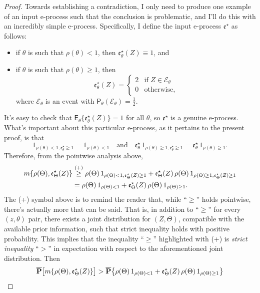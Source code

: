 \documentclass[10pt,a4paper]{amsart}
\newcommand{\E}{\mathsf{E}}
\newcommand{\eval}{\mathfrak{e}}
\newcommand{\prob}{\mathsf{P}}
\newcommand{\uuprob}{\mathbf{\overline{P}}}
\begin{document}
\begin{proof}
Towards establishing a contradiction, I only need to produce one example of an input e-process such that the conclusion is problematic, and I'll do this with an incredibly simple e-process.  Specifically, I define the input e-process $\eval^\star$ as follows:
\begin{itemize}
\item if $\theta$ is such that $\rho(\theta) < 1$, then $\eval_\theta^\star(Z) \equiv 1$, and 
\vspace{-2mm}
\item if $\theta$ is such that $\rho(\theta) \geq 1$, then  
\[ \eval_\theta^\star(Z) = \begin{cases} 2 & \text{if $Z \in \mathcal{E}_\theta$} \\ 0 & \text{otherwise}, \end{cases} \]
where $\mathcal{E}_\theta$ is an event with $\prob_\theta(\mathcal{E}_\theta) = \frac12$.
\end{itemize} 
It's easy to check that $\E_\theta\{ \eval_\theta^\star(Z) \} = 1$ for all $\theta$, so $\eval^\star$ is a genuine e-process.  What's important about this particular e-process, as it pertains to the present proof, is that 
\[ 1_{\rho(\theta) < 1, \eval_\theta^\star \geq 1} = 1_{\rho(\theta) < 1} \quad \text{and} \quad \eval_\theta^\star \, 1_{\rho(\theta) \geq 1, \eval_\theta^\star \geq 1} = \eval_\theta^\star \, 1_{\rho(\theta) \geq 1}. \]
Therefore, from the pointwise analysis above, 
\begin{align*}
m\{ \rho(\Theta), \eval_\Theta^\star(Z) \} & \overset{\text{\tiny (+)}}{\geq} \rho(\Theta) \, 1_{\rho(\Theta) < 1, \eval_\Theta^\star(Z) \geq 1} + \eval_\Theta^\star(Z) \, \rho(\Theta) \, 1_{\rho(\Theta) \geq 1, \eval_\Theta^\star(Z) \geq 1} \\
& = \rho(\Theta) \, 1_{\rho(\Theta) < 1} + \eval_\Theta^\star(Z) \, \rho(\Theta) \, 1_{\rho(\Theta) \geq 1}. 
\end{align*}
The (+) symbol above is to remind the reader that, while ``$\geq$'' holds pointwise, there's actually more that can be said.  That is, in addition to ``$\geq$'' for every $(z,\theta)$ pair, there exists a joint distribution for $(Z,\Theta)$, compatible with the available prior information, such that strict inequality holds with positive probability.  This implies that the inequality ``$\geq$'' highlighted with (+) is {\em strict inequality} ``$>$'' in expectation with respect to the aforementioned joint distribution.  Then 
\begin{align}
\uuprob\bigl[ m\{ \rho(\Theta), \eval_\Theta^\star(Z) \} \bigr] & > \uuprob\bigl\{ \rho(\Theta) \, 1_{\rho(\Theta) < 1} + \eval_\Theta^\star(Z) \, \rho(\Theta) \, 1_{\rho(\Theta) \geq 1} \bigr\} \notag \\

\end{align}
\end{proof}
\end{document}
